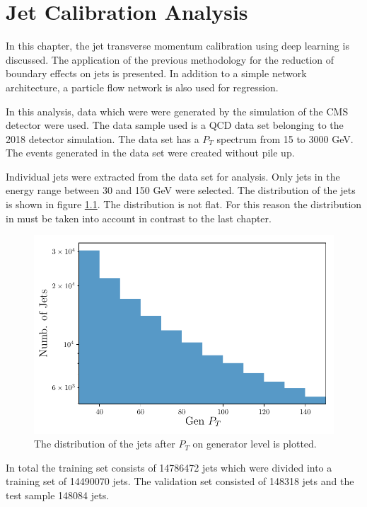 \documentclass[12pt, a4paper]{thesis}
\begin{document}

\chapter{Jet Calibration Analysis}
\label{sec:org03a9b39}

In this chapter, the jet transverse momentum calibration using deep
learning is discussed. The application of the previous methodology for
the reduction of boundary effects on jets is presented. In addition to
a simple network architecture, a particle flow network is also used
for regression.

In this analysis, data which were were generated by the simulation of
the CMS detector were used. The data sample used is a QCD data set
belonging to the 2018 detector simulation. The data set has a \(P_T\)
spectrum from 15 to 3000 GeV. The events generated in the data set
were created without pile up.

Individual jets were extracted from the data set for analysis. Only
jets in the energy range between 30 and 150 GeV were selected. The
distribution of the jets is shown in figure \ref{jet_distri}. The
distribution is not flat.  For this reason the distribution in must be
taken into account in contrast to the last chapter.

\begin{figure}[H]
  \centering
  \includegraphics[width=.9\linewidth]{../images/jet_distri.pdf}
  \caption{ The distribution of the jets after \(P_T\) on generator
    level is plotted.}
  \label{jet_distri}
\end{figure}

In total the training set consists of 14786472 jets which were divided
into a training set of 14490070 jets. The validation set consisted of
148318 jets and the test sample 148084 jets.
\end{document}
